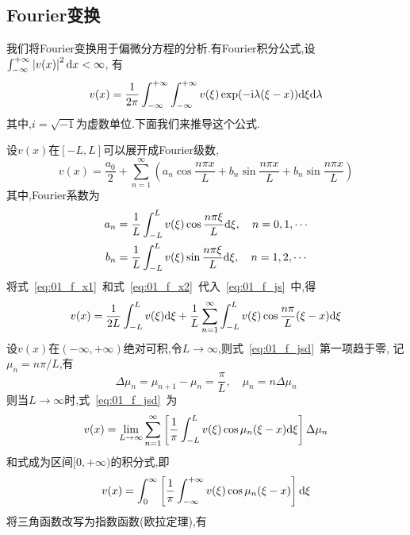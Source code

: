 \subsection{Fourier变换}
我们将Fourier变换用于偏微分方程的分析.有Fourier积分公式,设$\int_{-\infty}^{+\infty}\left|v(x)\right|^2\mathrm{d} x<\infty$,
有
\begin{equation}\label{eq:01_f}
 v(x)=\dfrac{1}{2\pi}\int_{-\infty}^{+\infty}\int_{-\infty}^{+\infty} v(\xi)\exp(-\mathrm{i}\lambda(\xi-x))
 \mathrm{d}\xi\mathrm{d}\lambda
\end{equation}
其中,$i=\sqrt{-1}$为虚数单位.下面我们来推导这个公式.\par
设$v(x)$在$[-L,L]$可以展开成Fourier级数,
\begin{equation}\label{eq:01_f_js}
 v(x)=\dfrac{a_0}{2}+\sum_{n=1}^{\infty}\left(a_n\cos\dfrac{n\pi x}{L}+
 b_n\sin\dfrac{n\pi x}{L}+b_n\sin\dfrac{n\pi x}{L}\right)
\end{equation}
其中,Fourier系数为
\begin{align}
 a_n &=\dfrac{1}{L}\int_{-L}^{L} v(\xi)\cos\dfrac{n\pi\xi}{L}\mathrm{d} \xi,\quad n=0,1,\cdots \label{eq:01_f_x1}\\
 b_n &=\dfrac{1}{L}\int_{-L}^{L} v(\xi)\sin\dfrac{n\pi\xi}{L}\mathrm{d} \xi,\quad n=1,2,\cdots \label{eq:01_f_x2}
\end{align}
将式~\eqref{eq:01_f_x1}~和式~\eqref{eq:01_f_x2}~代入~\eqref{eq:01_f_js}~中,得
\begin{equation}\label{eq:01_f_jsd}
 v(x)=\dfrac{1}{2L}\int_{-L}^{L} v(\xi)\mathrm{d} \xi + \dfrac{1}{L}\sum_{n=1}^{\infty}
      \int_{-L}^{L} v(\xi)\cos\dfrac{n\pi}{L}(\xi-x)\mathrm{d}\xi
\end{equation}
设$v(x)$在$(-\infty,+\infty)$绝对可积,令$L\to\infty$,则式~\eqref{eq:01_f_jsd}~第一项趋于零,
记$\mu_n=n\pi/L$,有
\begin{equation}
 \Delta\mu_n = \mu_{n+1}-\mu_n =\dfrac{\pi}{L},\quad \mu_n=n\Delta\mu_n
\end{equation}
则当$L\rightarrow\infty$时,式~\eqref{eq:01_f_jsd}~为
\begin{equation*}
 v(x)=\lim_{L\to\infty}\sum_{n=1}^{\infty}\left[\dfrac{1}{\pi}\int_{-L}^{L}
      v(\xi)\cos\mu_n(\xi-x)\mathrm{d}\xi\right]\Delta\mu_n
\end{equation*}
和式成为区间$[0,+\infty)$的积分式,即
\begin{equation}\label{eq:01_f_jfs}
 v(x)=\int_0^{\infty}\left[\dfrac{1}{\pi}\int_{-\infty}^{+\infty} v(\xi)\cos\mu_n(\xi-x)\right]\mathrm{d}\xi
\end{equation}
将三角函数改写为指数函数(欧拉定理),有
